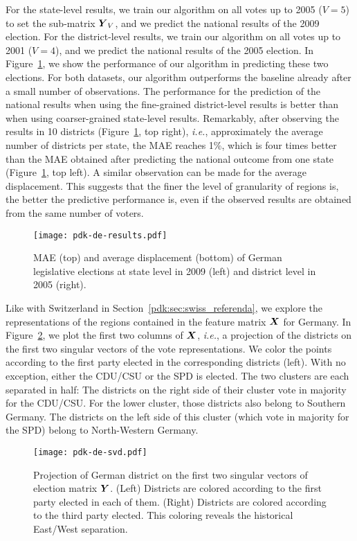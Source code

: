 For the state-level results, we train our algorithm on all votes up to 2005 ($V = 5$) to set the sub-matrix $\mbox{$\mbox{$\boldsymbol{Y}$}$}_V$, and we predict the national results of the 2009 election.
For the district-level results, we train our algorithm on all votes up to 2001 ($V = 4$), and we predict the national results of the 2005 election.
In Figure~\ref{pdk:fig:de_results}, we show the performance of our algorithm in predicting these two elections.
For both datasets, our algorithm outperforms the baseline already after a small number of observations.
The performance for the prediction of the national results when using the fine-grained district-level results is better than when using coarser-grained state-level results.
Remarkably, after observing the results in 10 districts (Figure~\ref{pdk:fig:de_results}, top right), \textit{i.e.}, approximately the average number of districts per state, the MAE reaches 1\%, which is four times better than the MAE obtained after predicting the national outcome from one state (Figure~\ref{pdk:fig:de_results}, top left).
A similar observation can be made for the average displacement.
This suggests that the finer the level of granularity of regions is, the better the predictive performance is, even if the observed results are obtained from the same number of voters.

\begin{figure}
	\centering
	\texttt{[image: pdk-de-results.pdf]}
	\caption{MAE (top) and average displacement (bottom) of German legislative elections at state level in 2009 (left) and district level in 2005 (right).}
	\label{pdk:fig:de_results}
\end{figure}

Like with Switzerland in Section~\ref{pdk:sec:swiss_referenda}, we explore the representations of the regions contained in the feature matrix $\mbox{$\mbox{$\boldsymbol{X}$}$}$ for Germany.
In Figure~\ref{pdk:fig:de_svd}, we plot the first two columns of $\mbox{$\mbox{$\boldsymbol{X}$}$}$, \textit{i.e.}, a projection of the districts on the first two singular vectors of the vote representations.
We color the points according to the first party elected in the corresponding districts (left).
With no exception, either the CDU/CSU or the SPD is elected.
The two clusters are each separated in half:
The districts on the right side of their cluster vote in majority for the CDU/CSU.
For the lower cluster, those districts also belong to Southern Germany.
The districts on the left side of this cluster (which vote in majority for the SPD) belong to North-Western Germany.

\begin{figure}
	\centering
	\texttt{[image: pdk-de-svd.pdf]}
	\caption{
		Projection of German district on the first two singular vectors of election matrix $\mbox{$\mbox{$\boldsymbol{Y}$}$}$.
		(Left) Districts are colored according to the first party elected in each of them.
		(Right) Districts are colored according to the third party elected.
		This coloring reveals the historical East/West separation.
	}
	\label{pdk:fig:de_svd}
\end{figure}

